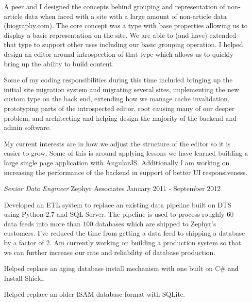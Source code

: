 \documentclass[margin]{res}
\begin{document}
\begin{resume}
                A peer and I designed the concepts behind grouping and representation of
                non-article data when faced with a site with a large amount of non-article
                data (biography.com). The core concept was a type with base properties
                allowing us to display a basic representation on the site. We are able to
                (and have) extended that type to support other uses including our basic
                grouping operation. I helped design an editor around introspection of that
                type which allows us to quickly bring up the ability to build content.

                Some of my coding responsibilities during this time included bringing
                up the initial site migration system and migrating several sites,
                implementing the new custom type on the back end, extending how we
                manage cache invalidation, prototyping parts of the introspected editor,
                root causing many of our deeper problem, and architecting and helping
                design the majority of the backend and admin software.

                My current interests are in how we adjust the structure of the
                editor so it is easier to grow. Some of this is around applying
                lessons we have learned building a large single page application with
                AngularJS. Additionally I am working on increasing the performance of
                the backend in support of better UI responsiveness.

                {\sl Senior Data Engineer} Zephyr Associates \hfill January 2011 - September 2012

                Developed an ETL system to replace an existing data
                pipeline built on DTS using Python 2.7 and SQL Server. The
                pipeline is used to process roughly 60 data feeds into
                more than 100 databases which are shipped to Zephyr's
                customers. I've reduced the time from getting a data feed
                to shipping a database by a factor of 2. Am currently
                working on building a production system so that we can
                further increase our rate and reliability of database
                production.

                Helped replace an aging database install mechanism with
                one built on C\# and Install Shield.

                Helped replace an older ISAM database format with SQLite.


\end{resume}
\end{document}
